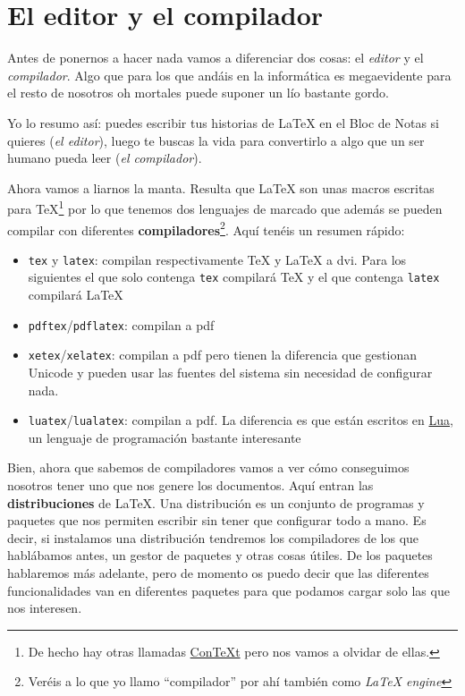 \section{El editor y el compilador}\label{el-editor-y-el-compilador}

Antes de ponernos a hacer nada vamos a diferenciar dos cosas: el
\emph{editor} y el \emph{compilador}. Algo que para los que andáis en la
informática es megaevidente para el resto de nosotros oh mortales puede
suponer un lío bastante gordo.

Yo lo resumo así: puedes escribir tus historias de LaTeX en el Bloc de
Notas si quieres (\emph{el editor}), luego te buscas la vida para
convertirlo a algo que un ser humano pueda leer (\emph{el compilador}).

Ahora vamos a liarnos la manta. Resulta que LaTeX son unas macros
escritas para TeX\footnote{De hecho hay otras llamadas
  \href{https://en.wikipedia.org/wiki/ConTeXt}{ConTeXt} pero nos vamos a
  olvidar de ellas.} por lo que tenemos dos lenguajes de marcado que
además se pueden compilar con diferentes \textbf{compiladores}\footnote{Veréis
  a lo que yo llamo ``compilador'' por ahí también como \emph{LaTeX
  engine}}. Aquí tenéis un resumen rápido:

\begin{itemize}
\item
  \texttt{tex} y \texttt{latex}: compilan respectivamente TeX y LaTeX a
  dvi. Para los siguientes el que solo contenga \texttt{tex} compilará
  TeX y el que contenga \texttt{latex} compilará LaTeX
\item
  \texttt{pdftex}/\texttt{pdflatex}: compilan a pdf
\item
  \texttt{xetex}/\texttt{xelatex}: compilan a pdf pero tienen la
  diferencia que gestionan Unicode y pueden usar las fuentes del sistema
  sin necesidad de configurar nada.
\item
  \texttt{luatex}/\texttt{lualatex}: compilan a pdf. La diferencia es
  que están escritos en \href{http://www.lua.org/}{Lua}, un lenguaje de
  programación bastante interesante
\end{itemize}

Bien, ahora que sabemos de compiladores vamos a ver cómo conseguimos
nosotros tener uno que nos genere los documentos. Aquí entran las
\textbf{distribuciones} de LaTeX. Una distribución es un conjunto de
programas y paquetes que nos permiten escribir sin tener que configurar
todo a mano. Es decir, si instalamos una distribución tendremos los
compiladores de los que hablábamos antes, un gestor de paquetes y otras
cosas útiles. De los paquetes hablaremos más adelante, pero de momento
os puedo decir que las diferentes funcionalidades van en diferentes
paquetes para que podamos cargar solo las que nos interesen.

